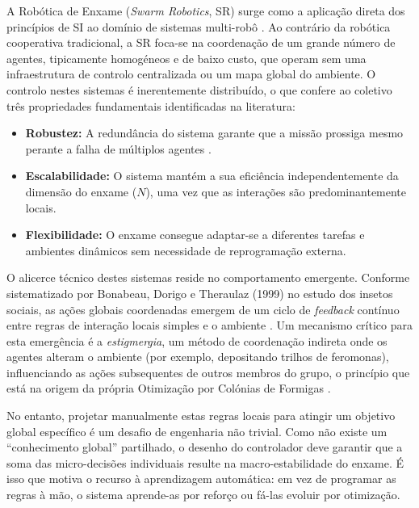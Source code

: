 \documentclass[12pt,reqno, twoside]{amsbook}
\theoremstyle{plain}
\numberwithin{equation}{chapter}
\numberwithin{section}{chapter}
\numberwithin{table}{chapter}
\numberwithin{figure}{chapter}
\begin{document}
A Robótica de Enxame (\textit{Swarm Robotics}, SR) surge como a aplicação direta dos princípios de SI ao domínio de sistemas multi-robô \cite{bonabeau1999swarm}. Ao contrário da robótica cooperativa tradicional, a SR foca-se na coordenação de um grande número de agentes, tipicamente homogéneos e de baixo custo, que operam sem uma infraestrutura de controlo centralizada ou um mapa global do ambiente. O controlo nestes sistemas é inerentemente distribuído, o que confere ao coletivo três propriedades fundamentais identificadas na literatura:
\begin{itemize}
    \item \textbf{Robustez:} A redundância do sistema garante que a missão prossiga mesmo perante a falha de múltiplos agentes \cite{huttenrauch2019deep}.
    \item \textbf{Escalabilidade:} O sistema mantém a sua eficiência independentemente da dimensão do enxame ($N$), uma vez que as interações são predominantemente locais.
    \item \textbf{Flexibilidade:} O enxame consegue adaptar-se a diferentes tarefas e ambientes dinâmicos sem necessidade de reprogramação externa.
\end{itemize}

O alicerce técnico destes sistemas reside no comportamento emergente. Conforme sistematizado por Bonabeau, Dorigo e Theraulaz (1999) no estudo dos insetos sociais, as ações globais coordenadas emergem de um ciclo de \textit{feedback} contínuo entre regras de interação locais simples e o ambiente \cite{bonabeau1999swarm}. Um mecanismo crítico para esta emergência é a \emph{estigmergia}, um método de coordenação indireta onde os agentes alteram o ambiente (por exemplo, depositando trilhos de feromonas), influenciando as ações subsequentes de outros membros do grupo, o princípio que está na origem da própria Otimização por Colónias de Formigas \cite{dorigo1992optimization}.

No entanto, projetar manualmente estas regras locais para atingir um objetivo global específico é um desafio de engenharia não trivial. Como não existe um ``conhecimento global'' partilhado, o desenho do controlador deve garantir que a soma das micro-decisões individuais resulte na macro-estabilidade do enxame. É isso que motiva o recurso à aprendizagem automática: em vez de programar as regras à mão, o sistema aprende-as por reforço ou fá-las evoluir por otimização.
\end{document}
